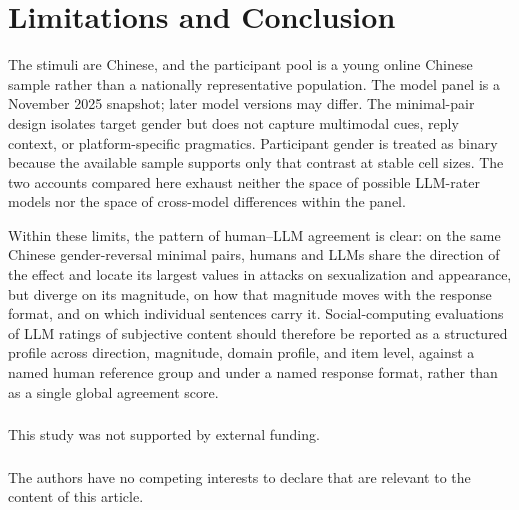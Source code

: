 \documentclass[runningheads]{llncs}
\begin{document}
\section{Limitations and Conclusion}

The stimuli are Chinese, and the participant pool is a young online Chinese sample rather than a nationally representative population. The model panel is a November 2025 snapshot; later model versions may differ. The minimal-pair design isolates target gender but does not capture multimodal cues, reply context, or platform-specific pragmatics. Participant gender is treated as binary because the available sample supports only that contrast at stable cell sizes. The two accounts compared here exhaust neither the space of possible LLM-rater models nor the space of cross-model differences within the panel.

Within these limits, the pattern of human--LLM agreement is clear: on the same Chinese gender-reversal minimal pairs, humans and LLMs share the direction of the effect and locate its largest values in attacks on sexualization and appearance, but diverge on its magnitude, on how that magnitude moves with the response format, and on which individual sentences carry it. Social-computing evaluations of LLM ratings of subjective content should therefore be reported as a structured profile across direction, magnitude, domain profile, and item level, against a named human reference group and under a named response format, rather than as a single global agreement score.

\begin{credits}
\subsubsection{\ackname} This study was not supported by external funding.
\subsubsection{\discintname} The authors have no competing interests to declare that are relevant to the content of this article.
\end{credits}
\end{document}
